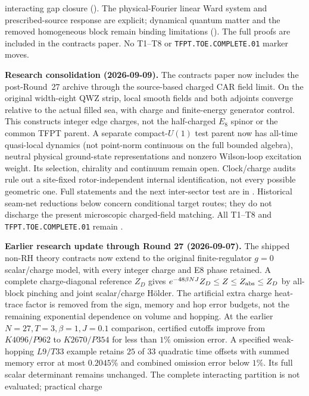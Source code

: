 \documentclass[11pt,a4paper]{article}
\begin{document}
\begin{keybox}
interacting gap closure ().
The physical-Fourier linear Ward system and prescribed-source response
are explicit; dynamical quantum matter and the removed homogeneous
block remain binding limitations ().
The full proofs are included in the contracts paper. No T1--T8 or
\texttt{TFPT.TOE.COMPLETE.01} marker moves.
\par\smallskip\noindent\textbf{Research consolidation (2026-09-09).}
The contracts paper now includes the post-Round~27 archive through the
source-based charged CAR field limit. On the original width-eight QWZ
strip, local smooth fields and both adjoints converge relative to the
actual filled sea, with charge and finite-energy generator control.
This constructs integer edge charges, not the half-charged $E_8$
spinor or the common TFPT parent. A separate compact-$U(1)$ test parent
now has all-time quasi-local dynamics (not point-norm continuous on
the full bounded algebra), neutral physical ground-state representations
and nonzero Wilson-loop excitation weight. Its selection, chirality
and continuum remain open. Clock/charge audits rule out a site-fixed
rotor-independent internal identification, not every possible geometric
one. Full statements and the next inter-sector test are in
.
Historical seam-net reductions below concern conditional target routes;
they do not discharge the present microscopic charged-field matching.
All T1--T8 and \texttt{TFPT.TOE.COMPLETE.01} remain \mO.
\par\smallskip\noindent\textbf{Earlier research update through Round 27 (2026-09-07).}
The shipped non-RH theory contracts now extend to the original finite-regulator
$g=0$ scalar/charge model, with every integer charge and E8 phase retained.
A complete charge-diagonal reference $Z_D$ gives
$e^{-48\beta NJ}Z_D\le Z\le Z_{\rm abs}\le Z_D$ by all-block pinching
and joint scalar/charge H\"older. The artificial extra charge heat-trace
factor is removed from the sign, memory and hop error budgets, not the
remaining exponential dependence on volume and hopping.
At the earlier $N=27,T=3,\beta=1,J=0.1$ comparison, certified cutoffs improve
from $K4096/P962$ to $K2670/P354$ for less than $1\%$ omission error.
A specified weak-hopping $L9/T33$ example retains $25$ of $33$ quadratic
time offsets with summed memory error at most $0.2045\%$ and combined
omission error below $1\%$. Its full scalar determinant remains unchanged.
The complete interacting partition is not evaluated; practical charge

\end{keybox}
\end{document}
